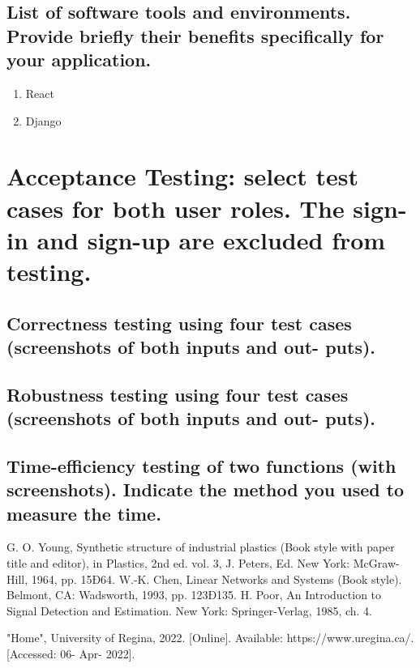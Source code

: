 \documentclass[letterpaper, 12 pt, conference]{ieeeconf}
\begin{document}
\subsection{List of software tools and environments. Provide briefly their benefits specifically for your application.}
\begin{enumerate}
   \item React
   \item Django
\end{enumerate}

\section{Acceptance Testing: select test cases for both user roles. The sign-in and sign-up are excluded from testing.}
\subsection{Correctness testing using four test cases (screenshots of both inputs and out- puts).}
\subsection{Robustness testing using four test cases (screenshots of both inputs and out- puts).}
\subsection{Time-eﬀiciency testing of two functions (with screenshots). Indicate the method you used to measure the time.}



\addtolength{\textheight}{-12cm}








\newpage


\begin{thebibliography}{99}

 G. O. Young, Synthetic structure of industrial plastics (Book style with paper title and editor), 	in Plastics, 2nd ed. vol. 3, J. Peters, Ed.  New York: McGraw-Hill, 1964, pp. 15Ð64.
 W.-K. Chen, Linear Networks and Systems (Book style).	Belmont, CA: Wadsworth, 1993, pp. 123Ð135.
 H. Poor, An Introduction to Signal Detection and Estimation.   New York: Springer-Verlag, 1985, ch. 4.

 "Home", University of Regina, 2022. [Online]. Available: https://www.uregina.ca/. [Accessed: 06- Apr- 2022].

\end{thebibliography}
\end{document}
